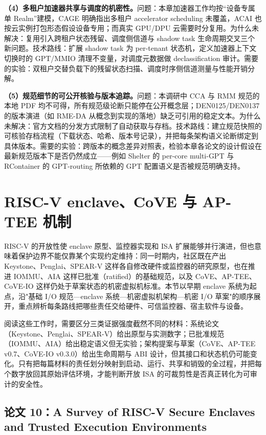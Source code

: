 \documentclass[11pt]{ctexart}
\begin{document}
\noindent\textbf{（4）多租户加速器共享与调度的机密性。}问题：本章加速器工作均按“设备专属单 Realm”建模，CAGE 明确指出多租户 accelerator scheduling 未覆盖\cite{wang2026cage}，ACAI 也按云实例打包形态假设设备专用\cite{acai2023}；而真实 GPU/DPU 云需要时分复用。为什么未解决：复用引入跨租户状态残留、调度侧信道与 shadow task 生命周期交叉三个新问题。技术路线：扩展 shadow task 为 per-tenant 状态机，定义加速器上下文切换时的 GPT/MMIO 清理不变量，对调度元数据做 declassification 审计。需要的实验：双租户交替负载下的残留状态扫描、调度时序侧信道测量与性能开销分解。\par
\noindent\textbf{（5）规范细节的可公开核验与版本追踪。}问题：本调研中 CCA 与 RMM 规范的本地 PDF 均不可得，所有规范级论断只能停在公开概念层\cite{arm_cca_spec,arm_rmm_spec}；DEN0125/DEN0137 的版本演进（如 RME-DA 从概念到实现的落地）缺乏可引用的稳定文本。为什么未解决：官方文档的分发方式限制了自动获取与存档。技术路线：建立规范快照的可核验存档流程（下载状态、哈希、版本号记录），并把每条架构语义论断绑定到具体版本。需要的实验：跨版本的概念差异对照表，检验本章各论文的设计假设在最新规范版本下是否仍然成立——例如 Shelter 的 per-core multi-GPT 与 RContainer 的 GPT-routing 所依赖的 GPT 配置语义是否被规范明确支持\cite{zhang2023shelter,zhou2025rcontainer}。\par
\section{RISC-V enclave、CoVE 与 AP-TEE 机制}
RISC-V 的开放性使 enclave 原型、监控器实现和 ISA 扩展能够并行演进，但也意味着保护边界不能仅靠某个实现约定维持：同一时期内，社区既在产出 Keystone、Penglai、SPEAR-V 这样各自修改硬件或监控器的研究原型，也在推进 IOMMU、AIA 这样已批准（ratified）的基础规范，以及 CoVE、AP-TEE、CoVE-IO 这样仍处于草案状态的机密虚拟机标准。本节以早期 enclave 系统为起点，沿"基础 I/O 规范—enclave 系统—机密虚拟机架构—机密 I/O 草案"的顺序展开，重点辨析每条路线把哪些责任交给硬件、可信监控器、宿主软件与设备。\par
阅读这些工作时，需要区分三类证据强度截然不同的材料：系统论文（Keystone、Penglai、SPEAR-V）给出原型与实测数字；已批准规范（IOMMU、AIA）给出稳定语义但无实验；架构提案与草案（CoVE、AP-TEE v0.7、CoVE-IO v0.3.0）给出生命周期与 ABI 设计，但其接口和状态机仍可能变化。只有把每篇材料的责任划分映射到启动、运行、共享和销毁的全过程，并把每个数字放回其原始评估环境，才能判断开放 ISA 的可裁剪性是否真正转化为可审计的安全性。\par
\subsection{论文 10：A Survey of RISC-V Secure Enclaves and Trusted Execution Environments}
\end{document}

